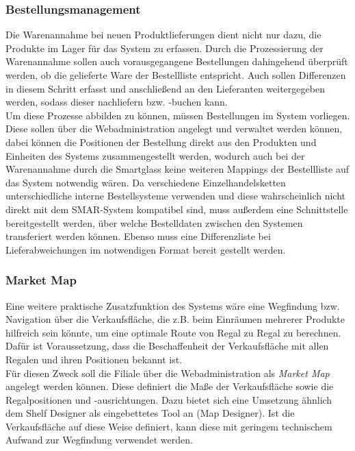 \subsubsection{Bestellungsmanagement}
Die Warenannahme bei neuen Produktlieferungen dient nicht nur dazu, die Produkte im Lager für das System zu erfassen. Durch die Prozessierung der Warenannahme sollen auch vorausgegangene Bestellungen dahingehend überprüft werden, ob die gelieferte Ware der Bestellliste entspricht. Auch sollen Differenzen in diesem Schritt erfasst und anschließend an den Lieferanten weitergegeben werden, sodass dieser nachliefern bzw. -buchen kann.\\

Um diese Prozesse abbilden zu können, müssen Bestellungen im System vorliegen. Diese sollen über die Webadministration angelegt und verwaltet werden können, dabei können die Positionen der Bestellung direkt aus den Produkten und Einheiten des Systems zusammengestellt werden, wodurch auch bei der Warenannahme durch die Smartglass keine weiteren Mappings der Bestellliste auf das System notwendig wären. Da verschiedene Einzelhandelsketten unterschiedliche interne Bestellsysteme verwenden und diese wahrscheinlich nicht direkt mit dem \acs{SMAR}-System kompatibel sind, muss außerdem eine Schnittstelle bereitgestellt werden, über welche Bestelldaten zwischen den Systemen transferiert werden können. Ebenso muss eine Differenzliste bei Lieferabweichungen im notwendigen Format bereit gestellt werden.

\subsubsection{Market Map}
Eine weitere praktische Zusatzfunktion des Systems wäre eine Wegfindung bzw. Navigation über die Verkaufsfläche, die z.B. beim Einräumen mehrerer Produkte hilfreich sein könnte, um eine optimale Route von Regal zu Regal zu berechnen. Dafür ist Voraussetzung, dass die Beschaffenheit der Verkaufsfläche mit allen Regalen und ihren Positionen bekannt ist.\\

Für diesen Zweck soll die Filiale über die Webadministration als \emph{Market Map} angelegt werden können. Diese definiert die Maße der Verkaufsfläche sowie die Regalpositionen und -ausrichtungen. Dazu bietet sich eine Umsetzung ähnlich dem Shelf Designer als eingebettetes Tool an (Map Designer). Ist die Verkaufsfläche auf diese Weise definiert, kann diese mit geringem technischem Aufwand zur Wegfindung verwendet werden.

